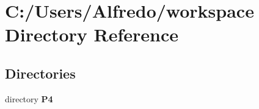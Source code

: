 \section{C\+:/\+Users/\+Alfredo/workspace Directory Reference}
\label{dir_3fd9d1d54eee551075ac8efcfb532615}
\subsection*{Directories}
\begin{DoxyCompactItemize}
\item 
directory {\bf P4}
\end{DoxyCompactItemize}
